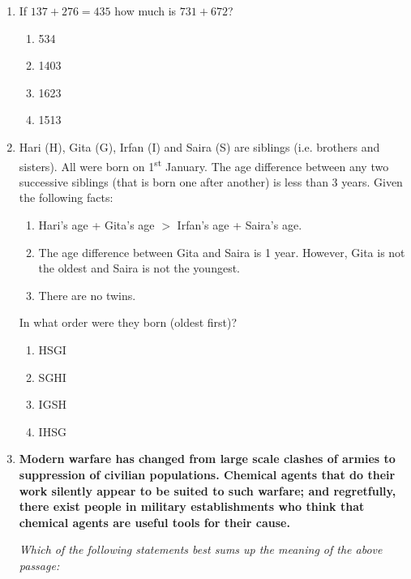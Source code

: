 \documentclass[journal]{IEEEtran}
\numberwithin{equation}{enumi}
\numberwithin{figure}{enumi}
\begin{document}
\begin{enumerate}
\item If $137 + 276 = 435$ how much is $731 + 672$?
\hfill{}
\begin{multicols}{4}
    \begin{enumerate}
    \item 534
    \item 1403
    \item 1623
    \item 1513
    \end{enumerate}
    \end{multicols}    




\item Hari (H), Gita (G), Irfan (I) and Saira (S) are siblings (i.e. brothers and sisters). All were born on 1\textsuperscript{st} January. The age difference between any two successive siblings (that is born one after another) is less than 3 years. Given the following facts:\\
\begin{enumerate}
    \item Hari's age + Gita's age $>$ Irfan's age + Saira's age.
    \item The age difference between Gita and Saira is 1 year. However, Gita is not the oldest and Saira is not the youngest.
    \item There are no twins.
\end{enumerate}
In what order were they born (oldest first)?
\hfill{}
\begin{multicols}{4}
    \begin{enumerate}
    \item  HSGI
    \item  SGHI
    \item IGSH
    \item IHSG
    \end{enumerate}
    \end{multicols}    



 
\item \textbf{Modern warfare has changed from large scale clashes of armies to suppression of civilian populations. Chemical agents that do their work silently appear to be suited to such warfare; and regretfully, there exist people in military establishments who think that chemical agents are useful tools for their cause.}

\textit{Which of the following statements best sums up the meaning of the above passage:}
\hfill{}
\begin{enumerate}
 

\end{enumerate}
\end{enumerate}
\end{document}
